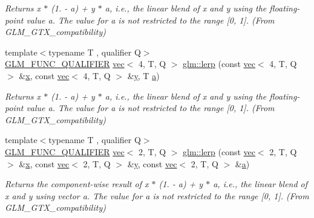 \begin{DoxyCompactItemize}
\begin{DoxyCompactList}\small\item\em Returns x $\ast$ (1. -\/ a) + y $\ast$ a, i.\+e., the linear blend of x and y using the floating-\/point value a. The value for a is not restricted to the range \mbox{[}0, 1\mbox{]}. (From G\+L\+M\+\_\+\+G\+T\+X\+\_\+compatibility) \end{DoxyCompactList}\item 
{\footnotesize template$<$typename T , qualifier Q$>$ }\\\mbox{\hyperlink{setup_8hpp_a33fdea6f91c5f834105f7415e2a64407}{G\+L\+M\+\_\+\+F\+U\+N\+C\+\_\+\+Q\+U\+A\+L\+I\+F\+I\+ER}} \mbox{\hyperlink{structglm_1_1vec}{vec}}$<$ 4, T, Q $>$ \mbox{\hyperlink{group__gtx__compatibility_ga89ac8e000199292ec7875519d27e214b}{glm\+::lerp}} (const \mbox{\hyperlink{structglm_1_1vec}{vec}}$<$ 4, T, Q $>$ \&\mbox{\hyperlink{_s_d_l__opengl_8h_ad0e63d0edcdbd3d79554076bf309fd47}{x}}, const \mbox{\hyperlink{structglm_1_1vec}{vec}}$<$ 4, T, Q $>$ \&\mbox{\hyperlink{_s_d_l__opengl_8h_a1675d9d7bb68e1657ff028643b4037e3}{y}}, T \mbox{\hyperlink{_s_d_l__opengl__glext_8h_a3309789fc188587d666cda5ece79cf82}{a}})
\begin{DoxyCompactList}\small\item\em Returns x $\ast$ (1. -\/ a) + y $\ast$ a, i.\+e., the linear blend of x and y using the floating-\/point value a. The value for a is not restricted to the range \mbox{[}0, 1\mbox{]}. (From G\+L\+M\+\_\+\+G\+T\+X\+\_\+compatibility) \end{DoxyCompactList}\item 
{\footnotesize template$<$typename T , qualifier Q$>$ }\\\mbox{\hyperlink{setup_8hpp_a33fdea6f91c5f834105f7415e2a64407}{G\+L\+M\+\_\+\+F\+U\+N\+C\+\_\+\+Q\+U\+A\+L\+I\+F\+I\+ER}} \mbox{\hyperlink{structglm_1_1vec}{vec}}$<$ 2, T, Q $>$ \mbox{\hyperlink{group__gtx__compatibility_gaf68de5baf72d16135368b8ef4f841604}{glm\+::lerp}} (const \mbox{\hyperlink{structglm_1_1vec}{vec}}$<$ 2, T, Q $>$ \&\mbox{\hyperlink{_s_d_l__opengl_8h_ad0e63d0edcdbd3d79554076bf309fd47}{x}}, const \mbox{\hyperlink{structglm_1_1vec}{vec}}$<$ 2, T, Q $>$ \&\mbox{\hyperlink{_s_d_l__opengl_8h_a1675d9d7bb68e1657ff028643b4037e3}{y}}, const \mbox{\hyperlink{structglm_1_1vec}{vec}}$<$ 2, T, Q $>$ \&\mbox{\hyperlink{_s_d_l__opengl__glext_8h_a3309789fc188587d666cda5ece79cf82}{a}})
\begin{DoxyCompactList}\small\item\em Returns the component-\/wise result of x $\ast$ (1. -\/ a) + y $\ast$ a, i.\+e., the linear blend of x and y using vector a. The value for a is not restricted to the range \mbox{[}0, 1\mbox{]}. (From G\+L\+M\+\_\+\+G\+T\+X\+\_\+compatibility) \end{DoxyCompactList}\item 

\end{DoxyCompactItemize}
